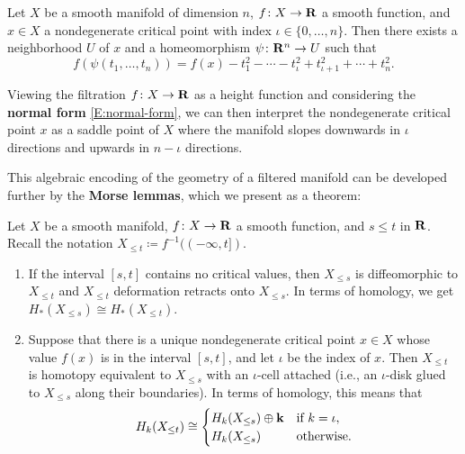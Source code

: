 \begin{proposition}
  Let $X$ be a smooth manifold of dimension $n$, $f \colon X \to \mathbf{R}$ a smooth function, and $x \in X$ a nondegenerate critical point with index $\iota \in \{0, \ldots, n\}$. Then there exists a neighborhood $U$ of $x$ and a homeomorphism $\psi \colon \mathbf{R}^n \to U$ such that
  \begin{equation}
  \label{E:normal-form}
    f(\psi(t_1, \ldots, t_n)) = f(x) - t_1^2 - \cdots - t_\iota^2 + t_{\iota + 1}^2 + \cdots + t_n^2.
  \end{equation}
\end{proposition}

Viewing the filtration $f \colon X \to \mathbf{R}$ as a height function and considering the \textbf{normal form} \eqref{E:normal-form}, we can then interpret the nondegenerate critical point $x$ as a saddle point of $X$ where the manifold slopes downwards in $\iota$ directions and upwards in $n - \iota$ directions.

This algebraic encoding of the geometry of a filtered manifold can be developed further by the \textbf{Morse lemmas}, which we present as a theorem:

\begin{theorem}
  Let $X$ be a smooth manifold, $f \colon X \to \mathbf{R}$ a smooth function, and $s \leq t$ in $\mathbf{R}$. Recall the notation $X_{\leq t} \coloneq f^{-1}((-\infty, t])$.
  \begin{enumerate}
    \item If the interval $[s, t]$ contains no critical values, then $X_{\leq s}$ is diffeomorphic to $X_{\leq t}$ and $X_{\leq t}$ deformation retracts onto $X_{\leq s}$. In terms of homology, we get $H_*(X_{\leq s}) \cong H_*(X_{\leq t})$.
    \item Suppose that there is a unique nondegenerate critical point $x \in X$ whose value $f(x)$ is in the interval $[s, t]$, and let $\iota$ be the index of $x$. Then $X_{\leq t}$ is homotopy equivalent to $X_{\leq s}$ with an $\iota$-cell attached (i.e., an $\iota$-disk glued to $X_{\leq s}$ along their boundaries). In terms of homology, this means that
    \[
      H_k(X_{\leq t}) \cong \begin{cases}
        H_k(X_{\leq s}) \oplus \mathbf{k} & \text{if } k = \iota, \\
        H_k(X_{\leq s}) & \text{otherwise}.
      \end{cases}
    \]
  \end{enumerate}
\end{theorem}

